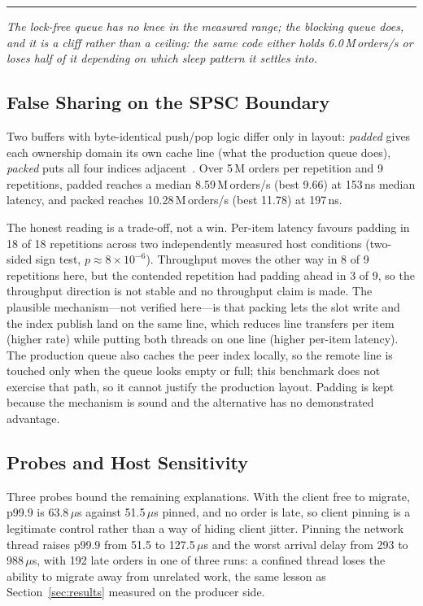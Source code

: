 \documentclass[conference]{IEEEtran}
\newcommand{\reading}[1]{%
  \par\vspace{1pt}\noindent
  \textcolor{corange}{\rule[-0.2ex]{2.2pt}{1.05em}}\hspace{3pt}%
  \textit{\textcolor{cgray}{#1}}\par\vspace{2pt}}
\newcommand{\us}{\,$\mu$s}
\newcommand{\ns}{\,ns}
\newcommand{\Mops}{\,M\,orders/s}
\begin{document}
\reading{The lock-free queue has no knee in the measured range; the blocking
queue does, and it is a cliff rather than a ceiling: the same code either holds
6.0\Mops{} or loses half of it depending on which sleep pattern it settles
into.}

\subsection{False Sharing on the SPSC Boundary}
Two buffers with byte-identical push/pop logic differ only in layout:
\emph{padded} gives each ownership domain its own cache line (what the production
queue does), \emph{packed} puts all four indices adjacent~\cite{bolosky}. Over
5\,M orders per repetition and 9 repetitions, padded reaches a median
8.59\Mops{} (best 9.66) at 153\ns{} median latency, and packed reaches
10.28\Mops{} (best 11.78) at 197\ns.

The honest reading is a trade-off, not a win. Per-item latency favours padding
in 18 of 18 repetitions across two independently measured host conditions
(two-sided sign test, $p\approx 8\times10^{-6}$). Throughput moves the other way
in 8 of 9 repetitions here, but the contended repetition had padding ahead in 3
of 9, so the throughput direction is not stable and no throughput claim is made.
The plausible mechanism---not verified here---is that packing lets the slot write
and the index publish land on the same line, which reduces line transfers per
item (higher rate) while putting both threads on one line (higher per-item
latency). The production queue also caches the peer index locally, so the remote
line is touched only when the queue looks empty or full; this benchmark does not
exercise that path, so it cannot justify the production layout. Padding is kept
because the mechanism is sound and the alternative has no demonstrated advantage.

\subsection{Probes and Host Sensitivity}
Three probes bound the remaining explanations. With the client free to migrate,
p99.9 is 63.8\us{} against 51.5\us{} pinned, and no order is late, so client
pinning is a legitimate control rather than a way of hiding client jitter.
Pinning the network thread raises p99.9 from 51.5 to 127.5\us{} and the worst
arrival delay from 293 to 988\us, with 192 late orders in one of three runs: a
confined thread loses the ability to migrate away from unrelated work, the same
lesson as Section~\ref{sec:results} measured on the producer side.
\end{document}
